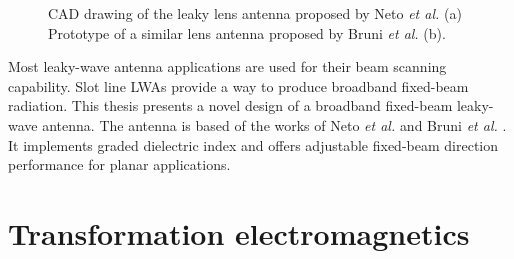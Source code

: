 \begin{figure} [t!]
\centering
  \noindent
\hspace*{\fill}%
	\noindent
	\mbox{}
\hspace*{\fill}%
  \mbox{}
	  \hspace*{\fill}%
  \caption[CAD drawing of the leaky lens antenna proposed by Neto \textit{et al.} and prototype of a similar lens antenna proposed by Bruni \textit{et al.}.]{CAD drawing of the leaky lens antenna proposed by Neto \textit{et al.} \cite{Neto2005} (a) Prototype of a similar lens antenna proposed by Bruni \textit{et al.} \cite{Bruni2007} (b).}
\label{fig:LWAbackground}
\end{figure}

Most leaky-wave antenna applications are used for their beam scanning capability. Slot line LWAs provide a way to produce broadband fixed-beam radiation.
%
%
This thesis presents a novel design of a broadband fixed-beam leaky-wave antenna. The antenna is based of the works of Neto \textit{et al.} \cite{Neto2005} and Bruni \textit{et al.} \cite{Bruni2007}. It implements graded dielectric index and offers adjustable fixed-beam direction performance for planar applications. 


\section{Transformation electromagnetics}

